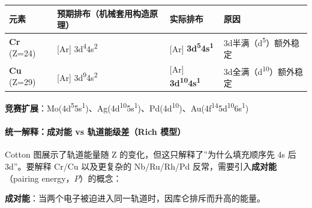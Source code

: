 \documentclass[a4paper,11pt]{ctexart}
\newcounter{none}
\begin{document}
{\def\LTcaptype{none} %
\begin{longtable}[]{@{}
  >{\raggedright\arraybackslash}p{}
  >{\raggedright\arraybackslash}p{}
  >{\raggedright\arraybackslash}p{}
  >{\raggedright\arraybackslash}p{}@{}}
\toprule\noalign{}
\begin{minipage}[b]{\linewidth}\raggedright
元素
\end{minipage} & \begin{minipage}[b]{\linewidth}\raggedright
预期排布（机械套用构造原理）
\end{minipage} & \begin{minipage}[b]{\linewidth}\raggedright
实际排布
\end{minipage} & \begin{minipage}[b]{\linewidth}\raggedright
原因
\end{minipage} \\
\midrule\noalign{}
\endhead
\bottomrule\noalign{}
\endlastfoot
\textbf{Cr} (Z=24) & {[}Ar{]} 3d\textsuperscript{4}4s\textsuperscript{2} & {[}Ar{]} \textbf{3d\textsuperscript{5}4s\textsuperscript{1}} & 3d半满（d\textsuperscript{5}）额外稳定 \\
\textbf{Cu} (Z=29) & {[}Ar{]} 3d\textsuperscript{9}4s\textsuperscript{2} & {[}Ar{]} \textbf{3d\textsuperscript{10}4s\textsuperscript{1}} & 3d全满（d\textsuperscript{10}）额外稳定 \\
\end{longtable}
}

\textbf{竞赛扩展}：Mo(4d\textsuperscript{5}5s\textsuperscript{1})、Ag(4d\textsuperscript{10}5s\textsuperscript{1})、Pd(4d\textsuperscript{10})、Au(4f\textsuperscript{14}5d\textsuperscript{10}6s\textsuperscript{1})

\paragraph{统一解释：成对能 vs 轨道能级差（Rich 模型）}\label{ux7edfux4e00ux89e3ux91caux6210ux5bf9ux80fd-vs-ux8f68ux9053ux80fdux7ea7ux5deerich-ux6a21ux578b}

Cotton 图展示了轨道能量随 Z 的变化，但这只解释了''为什么填充顺序先 4s 后 3d''。要解释 Cr/Cu 以及更复杂的 Nb/Ru/Rh/Pd 反常，需要引入\textbf{成对能}（pairing energy，\(P\)）的概念：

\textbf{成对能}：当两个电子被迫进入同一轨道时，因库仑排斥而升高的能量。
\end{document}
